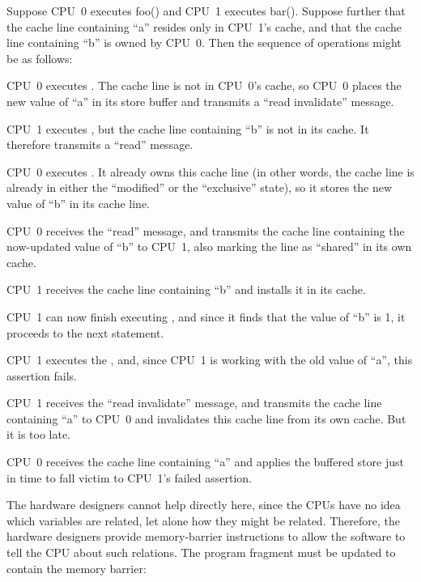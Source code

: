 Suppose CPU~0 executes foo() and CPU~1 executes bar().
Suppose further that the cache line containing ``a'' resides only in CPU~1's
cache, and that the cache line containing ``b'' is owned by CPU~0.
Then the sequence of operations might be as follows:
\begin{sequence}
\item	CPU~0 executes .
	The cache line is not in CPU~0's cache, so CPU~0 places the new
	value of ``a'' in its store buffer and transmits a ``read
	invalidate'' message.
	\label{seq:app:whymb:Store Buffers and Memory Barriers}
\item	CPU~1 executes , but the cache line
	containing ``b'' is not in its cache.
	It therefore transmits a ``read'' message.
\item	CPU~0 executes .
	It already owns this cache line (in other words, the cache line
	is already in either the ``modified'' or the ``exclusive'' state),
	so it stores the new value of ``b'' in its cache line.
\item	CPU~0 receives the ``read'' message, and transmits the
	cache line containing the now-updated value of ``b''
	to CPU~1, also marking the line as ``shared'' in its own cache.
\item	CPU~1 receives the cache line containing ``b'' and installs
	it in its cache.
\item	CPU~1 can now finish executing ,
	and since it finds that the value of ``b'' is 1, it proceeds
	to the next statement.
\item	CPU~1 executes the , and, since CPU~1 is
	working with the old value of ``a'', this assertion fails.
\item	CPU~1 receives the ``read invalidate'' message, and
	transmits the cache line containing ``a'' to CPU~0 and
	invalidates this cache line from its own cache.
	But it is too late.
\item	CPU~0 receives the cache line containing ``a'' and applies
	the buffered store just in time to fall victim to CPU~1's
	failed assertion.
\end{sequence}

\QuickQuizEnd

The hardware designers cannot help directly here, since the CPUs have
no idea which variables are related, let alone how they might be related.
Therefore, the hardware designers provide memory-barrier instructions
to allow the software to tell the CPU about such relations.
The program fragment must be updated to contain the memory barrier:

